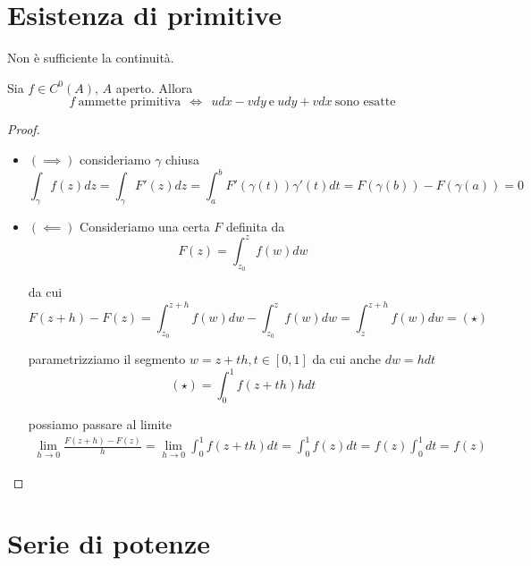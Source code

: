 \section{Esistenza di primitive}

Non è sufficiente la continuità.
\begin{thm}
Sia $f\in C^{0}(A)$, $A$ aperto. Allora
\begin{equation*}
f\ \text{ammette primitiva} \ \ \iff \ \ udx - vdy\ \text{e} \ udy + vdx\ \text{sono esatte}
\end{equation*}
\end{thm}
\begin{proof}\leavevmode
\begin{itemize}
\item $(\implies)$ consideriamo $\gamma $ chiusa
\begin{equation*}
\int_{\gamma} f(z) dz = \int_{\gamma} F'(z) dz = \int^{b}_{a} F'(\gamma (t)) \gamma'(t) dt = F(\gamma (b)) - F(\gamma (a)) = 0
\end{equation*}
\item $(\impliedby)$ Consideriamo una certa $F$ definita da
\begin{equation*}
F(z) = \int^{z}_{z_{0}} f(w) dw
\end{equation*}

da cui
\begin{equation*}
F(z + h) - F(z) = \int^{z + h}_{z_{0}} f(w) dw - \int^{z}_{z_{0}} f(w) dw = \int^{z + h}_{z} f(w) dw = (\star)
\end{equation*}

parametrizziamo il segmento $w = z + th, t\in [0, 1]$ da cui anche $dw = hdt$
\begin{equation*}
(\star) = \int^{1}_{0} f(z + th) hdt
\end{equation*}

possiamo passare al limite
\begin{gather*}
\lim\limits_{h\rightarrow 0}\frac{F(z + h) - F(z)}{h} = \lim\limits_{h\rightarrow 0}\int^{1}_{0} f(z + th) dt = \int^{1}_{0} f(z) dt = f(z)\int^{1}_{0} dt = f(z)
\end{gather*}

\end{itemize}
\end{proof}

\section{Serie di potenze}

